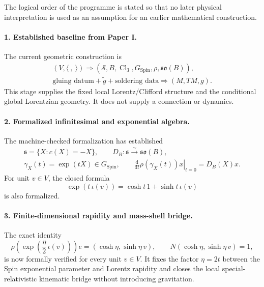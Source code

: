 \documentclass[11pt,a4paper]{article}
\theoremstyle{remark}
\newcommand{\Cl}{\operatorname{Cl}}
\newcommand{\SpinG}{G_{\mathrm{Spin}}}
\newcommand{\Smodel}{\mathcal S}
\newcommand{\soB}{\mathfrak{so}(B)}
\newcommand{\dd}{\mathrm d}
\begin{document}
The logical order of the programme is stated so that no later physical interpretation is used as an assumption for an earlier mathematical construction.

\paragraph{1. Established baseline from Paper I.}
The current geometric construction is
\begin{equation}
\begin{gathered}
(V,\langle\ ,\ \rangle)
\Longrightarrow
(\Smodel,B,\Cl_3,\SpinG,\rho,\soB),\\
\text{gluing datum}+\widetilde g+\text{soldering data}
\Longrightarrow
(M,TM,g).
\end{gathered}
\tag{7.1}
\end{equation}
This stage supplies the fixed local Lorentz/Clifford structure and the conditional global Lorentzian geometry.  It does not supply a connection or dynamics.

\paragraph{2. Formalized infinitesimal and exponential algebra.}
The machine-checked formalization has established
\begin{equation}
\begin{gathered}
\mathfrak s=\{X:c(X)=-X\},
\qquad
D_B:\mathfrak s\xrightarrow{\sim}\soB,\\
\gamma_X(t)=\exp(tX)\in\SpinG,
\qquad
\left.\frac{\dd}{\dd t}\rho(\gamma_X(t))x\right|_{t=0}=D_B(X)x.
\end{gathered}
\tag{7.2}
\end{equation}
For unit \(v\in V\), the closed formula
\[
  \exp(t\,\iota(v))=\cosh t\,1+\sinh t\,\iota(v)
\]
is also formalized.

\paragraph{3. Finite-dimensional rapidity and mass-shell bridge.}
The exact identity
\begin{equation}
  \rho\!\left(\exp\!\left(\frac{\eta}{2}\,\iota(v)\right)\right)e
  =
  (\cosh\eta,\sinh\eta\,v),
  \qquad
  N(\cosh\eta,\sinh\eta\,v)=1,
\tag{7.3}
\end{equation}
is now formally verified for every unit \(v\in V\).  It fixes the factor \(\eta=2t\) between the Spin exponential parameter and Lorentz rapidity and closes the local special-relativistic kinematic bridge without introducing gravitation.
\end{document}
